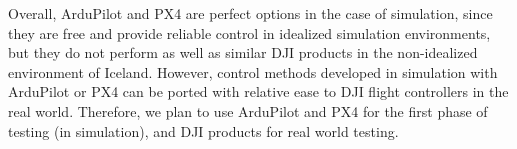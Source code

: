 Overall, ArduPilot and PX4 are perfect options in the case of simulation,
since they are free and provide reliable control in idealized simulation environments,
but they do not perform as well as similar DJI products in the non-idealized environment of Iceland.
However, control methods developed in simulation with ArduPilot or PX4 can be ported with relative ease to DJI flight controllers in the real world.
Therefore, we plan to use ArduPilot and PX4 for the first phase of testing (in simulation),
and DJI products for real world testing.